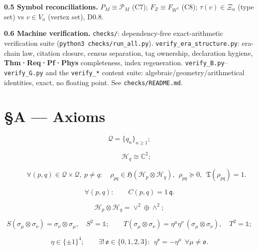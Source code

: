 \textbf{0.5 Symbol reconciliations.} $P_M\equiv\mathcal P_M$ (C7); $F_Z\equiv F_{W^3}$ (C8); $\tau(v)\in\Xi_n$ (type set) vs $v\in V_n$ (vertex set), D0.8.

\textbf{0.6 Machine verification.} \texttt{checks/\allowbreak{}}: dependency-free exact-arithmetic verification suite (\texttt{python3\ checks/\allowbreak{}run\_\allowbreak{}all.py}). \texttt{verify\_\allowbreak{}era\_\allowbreak{}structure.py}: era-chain law, citation closure, census separation, tag ownership, declaration hygiene, \textbf{Thm·Req·Pf·Phys} completeness, index regeneration. \texttt{verify\_\allowbreak{}B.py}–\texttt{verify\_\allowbreak{}G.py} and the \texttt{verify\_\allowbreak{}*} content suite: algebraic/geometry/arithmetical identities, exact, no floating point. See \texttt{checks/\allowbreak{}README.md}.

\section[§A — Axioms]{\texorpdfstring{§A — Axioms}{SA - Axioms}}

\begin{axiom}[{\texorpdfstring{A1}{A1}}]\label{tag:A1}
\[
\mathcal Q=\{q_n\}_{n\ge1};
\]

\[
\qquad \mathcal H_q\cong\mathbb C^2;
\]

\[
\qquad \forall(p,q)\in\mathcal Q\times\mathcal Q,\ p\ne q:\quad
\rho_{pq}\in\mathfrak H(\mathcal H_p\otimes\mathcal H_q),\ \ \rho_{pq}\succeq0,\ \ \mathfrak T(\rho_{pq})=1 .
\]

\end{axiom}

\begin{axiom}[{\texorpdfstring{A2}{A2}}]\label{tag:A2}
\[
\forall(p,q):\qquad C(p,q)=1\,\mathfrak q .
\]

\end{axiom}

\begin{axiom}[{\texorpdfstring{A3}{A3}}]\label{tag:A3}
\[
\mathcal H_p\otimes\mathcal H_q=\vee^2\oplus\wedge^2;
\]

\[
S(\sigma_\mu\otimes\sigma_\nu)=\sigma_\nu\otimes\sigma_\mu,\quad S^2=\mathbb1;\qquad
T(\sigma_\mu\otimes\sigma_\nu)=\eta^\mu\eta^\nu\,(\sigma_\mu\otimes\sigma_\nu),\quad
T^2=\mathbb1;
\]

\[
\eta\in\{\pm1\}^4;\qquad
\exists!\,\mathfrak o\in\{0,1,2,3\}:\ \ \eta^{\mathfrak o}=-\eta^{\mu}\ \ \forall\mu\ne\mathfrak o .
\]

\end{axiom}

